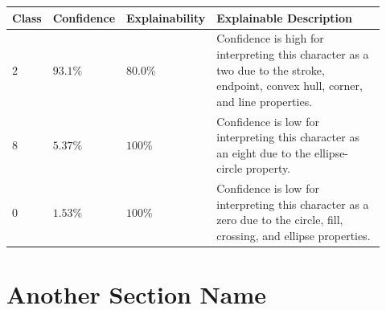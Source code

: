 \documentclass[12pt, oneside]{book}
\begin{document}
\begin{table}[h!]
    \renewcommand{\arraystretch}{1.3}
     \label{table:mnist_example2_explanation}
    \begin{tabular}{| m{0.06\linewidth} | m{0.14\linewidth} | m{0.17\linewidth} | m{0.55\linewidth} |}
    \hline
     Class & Confidence & Explainability & Explainable Description \\
    \hline \hline
    $2$ & $93.1\%$ & $80.0\%$ & Confidence is high for interpreting this character as a two due to the stroke, endpoint, convex hull, corner, and line properties. \\ 
    \hline
    $8$ & $5.37\%$ & $100\%$ & Confidence is low for interpreting this character as an eight due to the ellipse-circle property. \\
    \hline
    $0$ & $1.53\%$ & $100\%$ & Confidence is low for interpreting this character as a zero due to the circle, fill, crossing, and ellipse properties. \\
    \hline
    \end{tabular}
\end{table}

\section{Another Section Name}

\lipsum[1]
\end{document}
